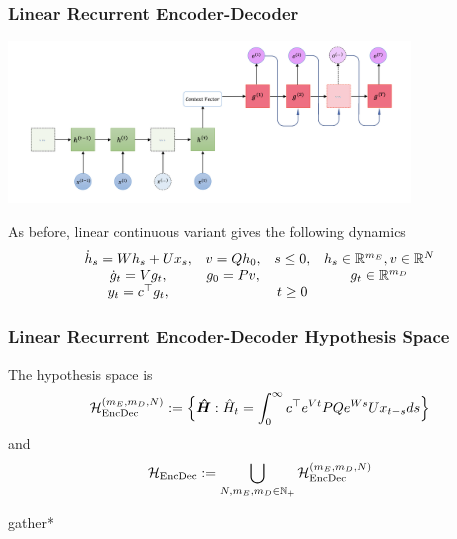 \begin{frame}
	\frametitle{Linear Recurrent Encoder-Decoder}

	\begin{center}
		\includegraphics[width=0.8\textwidth]{figures/encdec.png}
	\end{center}

	As before, linear continuous variant gives the following dynamics
	\begin{equation*}
		\begin{matrix}
			\dot{h}_s = Wh_s+Ux_s,
			& v=Qh_0,
			& s\leq 0,
			& h_s \in \mathbb{R}^{m_E}, v \in \mathbb{R}^{N}\\
			\dot{g}_t = Vg_t,
			& g_0=Pv,
			&
			& g_t \in \mathbb{R}^{m_D}
			\\
			y_t = c^\top g_t,
			&
			& t\ge 0
			&
		\end{matrix}
	\end{equation*}

\end{frame}

\begin{frame}
	\frametitle{Linear Recurrent Encoder-Decoder Hypothesis Space}

	The hypothesis space is
	\begin{equation*}
		\mathcal H_{\text{EncDec}}^{(m_E,m_D,N)} :=
		\Big\{\bm {\hat H}: \hat H_t = \int_{0}^{\infty} c^\top e^{Vt} PQe^{W s} U x_{t-s} ds \Big\}
	\end{equation*}
	and
	\begin{equation*}
		\mathcal H_{\text{EncDec}} := \bigcup_{N,m_E,m_D \in \mathbb{N}_+}
		\mathcal H_{\text{EncDec}}^{(m_E,m_D,N)}
	\end{equation*}

	\pause{}

	\medskip
	\medskip

	\begin{empheq}[box=\mymath]{gather*}
    \end{empheq}

\end{frame}

